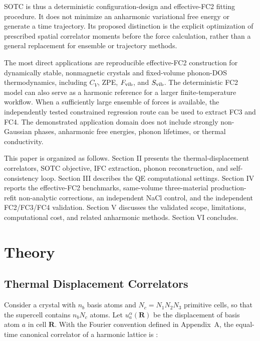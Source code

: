 \documentclass[aps,prb,reprint,amsmath,amssymb,floatfix]{revtex4-2}
\begin{document}
\color{revisionblue}
SOTC is thus a deterministic configuration-design and effective-FC2 fitting
procedure. It does not minimize an anharmonic variational free energy or
generate a time trajectory. Its proposed distinction is the explicit
optimization of prescribed spatial correlator moments before the force
calculation, rather than a general replacement for ensemble or trajectory
methods.
\color{black}

\color{revisionblue}
The most direct applications are reproducible effective-FC2 construction for
dynamically stable, nonmagnetic crystals and fixed-volume phonon-DOS
thermodynamics, including \(C_V\), ZPE, \(F_{\rm vib}\), and
\(S_{\rm vib}\). The deterministic FC2 model can also serve as a harmonic
reference for a larger finite-temperature workflow. When a sufficiently large
ensemble of forces is available, the independently tested constrained
regression route can be used to extract FC3 and FC4. The demonstrated application domain does not
include strongly non-Gaussian phases, anharmonic free energies, phonon
lifetimes, or thermal conductivity.
\color{black}

\color{revisionblue}
This paper is organized as follows. Section II presents the thermal-displacement
correlators, SOTC objective, IFC extraction, phonon reconstruction, and
self-consistency loop. Section III describes the QE computational settings.
Section IV reports the effective-FC2 benchmarks, same-volume three-material
production-refit non-analytic corrections, an independent NaCl control,
and the independent FC2/FC3/FC4 validation. Section V discusses the validated
scope, limitations, computational cost, and related anharmonic methods.
Section VI concludes.
\color{black}

\section{Theory}\label{theory}

\subsection{Thermal Displacement
Correlators}\label{thermal-displacement-correlators}

\color{revisionblue}
Consider a crystal with \(n_b\) basis atoms and \(N_c=N_1N_2N_3\)
primitive cells, so that the supercell contains \(n_bN_c\) atoms. Let
\(u_a^\alpha(\mathbf R)\) be the displacement of basis atom \(a\) in cell
\(\mathbf R\). With the Fourier convention defined in Appendix~A, the
equal-time canonical correlator of a harmonic lattice is \cite{ref13}:
\color{black}
\end{document}
